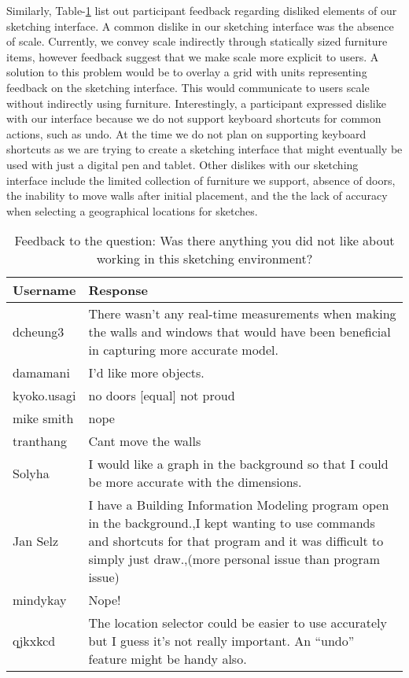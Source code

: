 Similarly, Table-\ref{fig:dislike} list out participant feedback regarding disliked elements of our sketching interface.
A common dislike in our sketching interface was the absence of scale.
Currently, we convey scale indirectly through statically sized furniture items, however feedback suggest that we make scale more explicit to users.
A solution to this problem would be to overlay a grid with units representing feedback on the sketching interface. This would communicate to users scale without indirectly using furniture.
Interestingly, a participant expressed dislike with our interface because we do not support keyboard shortcuts for common actions, such as undo.
At the time we do not plan on supporting keyboard shortcuts as we are trying to create a sketching interface that might eventually be used with just a digital pen and tablet.
Other dislikes with our sketching interface include the limited collection of furniture we support, absence of doors, the inability to move walls after initial placement, and the the lack of accuracy when selecting a geographical locations for sketches.

\begin{table}[!ht]
\centering
\caption[Was there anything you did not like about working in this sketching environment?]{Feedback to the question: Was there anything you did not like about working in this sketching environment?}
\label{fig:dislike}
\begin{tabular}{|p{}|p{}|}
\hline
\rowcolor[HTML]{EFEFEF} 
\textbf{Username} & \textbf{Response} \\ \hline
dcheung3 & There wasn't any real-time measurements when making the walls and windows that would have been beneficial in capturing more accurate model. \\ \hline
damamani & I'd like more objects. \\ \hline
kyoko.usagi & no doors {[}equal{]} not proud \\ \hline
mike smith & nope \\ \hline
tranthang & Cant move the walls \\ \hline
Solyha & I would like a graph in the background so that I could be more accurate with the dimensions. \\ \hline
Jan Selz & I have a Building Information Modeling program open in the background.,I kept wanting to use commands and shortcuts for that program and it was difficult to simply just draw.,(more personal issue than program issue) \\ \hline
mindykay & Nope! \\ \hline
qjkxkcd & The location selector could be easier to use accurately but I guess it's not really important. An ``undo'' feature might be handy also. \\ \hline
\end{tabular}
\end{table}



